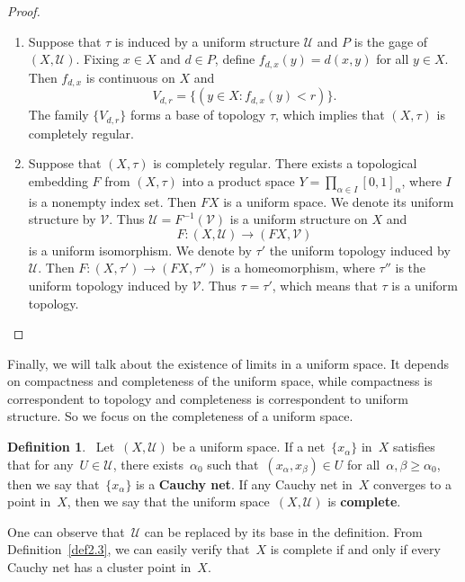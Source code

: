 \documentclass[12pt,a4paper,draft]{article}  %
\theoremstyle{definition}
\newtheorem{definition}{Definition}[section]
\numberwithin{equation}{section}
\begin{document}
\begin{proof}
\begin{enumerate}
    \item Suppose that $\tau$ is induced by a uniform structure $\mathcal{U}$
        and $P$ is the gage of $(X,\mathcal{U})$.
        Fixing $x \in X$ and $d \in P$, define $f_{d,x}(y) = d(x,y)$ for all $y \in X$.
        Then $f_{d,x}$ is continuous on $X$ and 
        $$ V_{d,r}= \{(y \in X: f_{d,x}(y) < r)\}. $$
        The family $\{V_{d,r}\}$ forms a base of topology $\tau$, which implies that $(X,\tau)$ is completely regular.
    \item Suppose that $(X,\tau)$ is completely regular.
        There exists a topological embedding $F$ from $(X,\tau)$ into a product space
        $ Y = \prod_{\alpha \in I} [0,1]_\alpha $,
        where $I$ is a nonempty index set.
        Then $FX$ is a uniform space. We denote its uniform structure by $\mathcal{V}$.
        Thus $\mathcal{U}=F^{-1}(\mathcal{V})$ is a uniform structure on $X$ and 
        \[
        F: (X,\mathcal{U}) \rightarrow (FX,\mathcal{V})
        \]
        is a uniform isomorphism.
        We denote by $\tau'$ the uniform topology induced by $\mathcal{U}$.
        Then $F:(X,\tau') \rightarrow (FX,\tau'')$ is a homeomorphism,
        where $\tau''$ is the uniform topology induced by $\mathcal{V}$.
        Thus $\tau=\tau'$, which means that $\tau$ is a uniform topology.
\end{enumerate}

\end{proof}
Finally, we will talk about the existence of limits in a uniform space.
It depends on compactness and completeness of the uniform space, while
compactness is correspondent to topology and completeness is correspondent to uniform structure.
So we focus on the completeness of a uniform space.
\begin{definition}~\label{def2.3}
    Let~$(X,\mathcal{U})$ be a uniform space. 
    If a net~$\{x_\alpha\}$ in~$X$ satisfies that for any~$U \in \mathcal{U}$, there exists~$\alpha_0$ such that~$(x_\alpha,x_\beta) \in U$ for all~$\alpha,\beta \geq \alpha_0$, then we say that~$\{x_\alpha\}$ is a \textbf{Cauchy net}.
    If any Cauchy net in~$X$ converges to a point in~$X$, then we say that the uniform space~$(X,\mathcal{U})$ is \textbf{complete}.
\end{definition}
One can observe that~$\mathcal{U}$ can be replaced by its base in the definition.
From Definition~\eqref{def2.3}, we can easily verify that~$X$ is complete 
if and only if every Cauchy net has a cluster point in~$X$.
\end{document}
